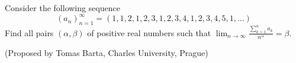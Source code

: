 Consider the following sequence
$$(a_n)_{n=1}^{\infty}=(1,1,2,1,2,3,1,2,3,4,1,2,3,4,5,1,\dots)$$Find all pairs $(\alpha, \beta)$ of positive real numbers such that $\lim_{n\to \infty}\frac{\displaystyle\sum_{k=1}^n a_k}{n^{\alpha}}=\beta$.

(Proposed by Tomas Barta, Charles University, Prague)